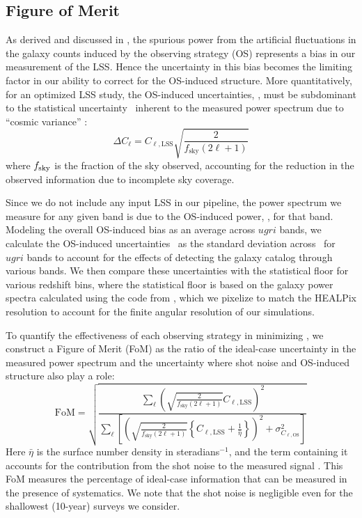 \subsection{Figure of Merit}
\label{sec:\secname:FoM}
As derived and discussed in \citet{AwanEtal2016}, the spurious power from the artificial fluctuations in the galaxy counts induced by the observing strategy (OS) represents a bias in our measurement of the LSS. Hence the uncertainty in this bias becomes the limiting factor in our ability to correct for the OS-induced structure. More quantitatively, for an optimized LSS study, the OS-induced uncertainties, \sigmaOS, must be subdominant to the statistical uncertainty \statFloor\ inherent to the measured power spectrum due to ``cosmic variance'' \citep{Dodelson}:
\begin{equation}
	\Delta C_\ell= C_{\ell,\mathrm{LSS}} \sqrt{\frac{2}{f_{\mathrm{sky}} (2\ell + 1)}}
	\label{eq: statFloor}
\end{equation}
where $f_{\rm{sky}}$ is the fraction of the sky observed, accounting for the reduction in the observed information due to incomplete sky coverage.

Since we do not include any input LSS in our pipeline, the power spectrum we measure for any given band is due to the OS-induced power, \CellOS, for that band. Modeling the overall OS-induced bias as an average across $ugri$ bands, we calculate the OS-induced uncertainties \sigmaOS\ as the standard deviation across \CellOS\ for $ugri$ bands to account for the effects of detecting the galaxy catalog through various bands. We then compare these uncertainties with the statistical floor for various redshift bins, where the statistical floor is based on the galaxy power spectra calculated using the code from \citet{Zhan2006}, which we pixelize to match the HEALPix resolution to account for the finite angular resolution of our simulations.

To quantify the effectiveness of each observing strategy in minimizing \sigmaOS, we construct a Figure of Merit (FoM) as the ratio of the ideal-case uncertainty in the measured power spectrum and the uncertainty where shot noise and OS-induced structure also play a role:
\begin{equation}
	\mathrm{FoM} = \sqrt{\frac{\sum\limits_\ell{\left({\sqrt{\frac{2}{f_{\mathrm{sky}} (2\ell + 1)}}C_{\ell, \mathrm{LSS}}} \right)}^2}{\sum\limits_\ell \left[{ \left( { \sqrt{\frac{2}{f_{\mathrm{sky}} (2\ell + 1)}}\left\{{C_{\ell, \mathrm{LSS}} + \frac{1}{\bar{\eta}}} \right\}  } \right ) ^2 + \sigma_{C_{\ell,\mathrm{OS}}}^2  }\right]}}
\label{eq: FoM}
\end{equation}
Here $\bar{\eta}$ is the surface number density in steradians$^{-1}$, and the term containing it accounts for the contribution from the shot noise to the measured signal \citep{HutererEtal2001,Jing2005}. This FoM measures the percentage of ideal-case information that can be measured in the presence of systematics. We note that the shot noise is negligible even for the shallowest (10-year) surveys we consider.

